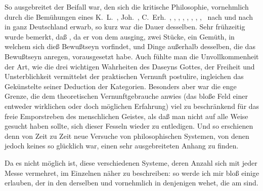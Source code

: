 \begin{aufza} 
\item So ausgebreitet der Beifall war, den sich die kritische Philosophie, vornehmlich durch die Bemühungen eines K.~L.~, Joh.~, C.~Erh.~, , , , , , , , \umA\  nach und nach in ganz Deutschland erwarb, so kurz war die Dauer desselben. Sehr frühzeitig wurde bemerkt, daß , da er von dem  ausging, zwei Stücke, ein Gemüth, in welchem sich dieß Bewußtseyn vorfindet, und Dinge außerhalb desselben, die das Bewußtseyn anregen, vorausgesetzt habe. Auch fühlte man die Unvollkommenheit der Art, wie  die drei wichtigen Wahrheiten des Daseyns Gottes, der Freiheit und Unsterblichkeit vermittelst der praktischen Vernunft postulire, ingleichen das Gekünstelte seiner Deduction der Kategorien. Besonders aber war die enge Grenze, die  dem theoretischen Vernunftgebrauche anwies (das bloße Feld einer entweder wirklichen oder doch möglichen Erfahrung) viel zu beschränkend für das freie Emporstreben des menschlichen Geistes, als daß man nicht auf alle Weise gesucht haben sollte, sich dieser Fesseln wieder zu entledigen. Und so erschienen denn von Zeit zu Zeit neue Versuche von philosophischen Systemen, von denen jedoch keines so glücklich war, einen sehr ausgebreiteten Anhang zu finden.
\item Da es nicht möglich ist, diese verschiedenen Systeme, deren Anzahl sich mit jeder Messe vermehret, im Einzelnen näher zu beschreiben: so werde ich mir bloß einige  erlauben, der in den  derselben und vornehmlich in denjenigen wehet, die am  sind.
\begin{aufzb} 

\end{aufzb}
\end{aufza}
